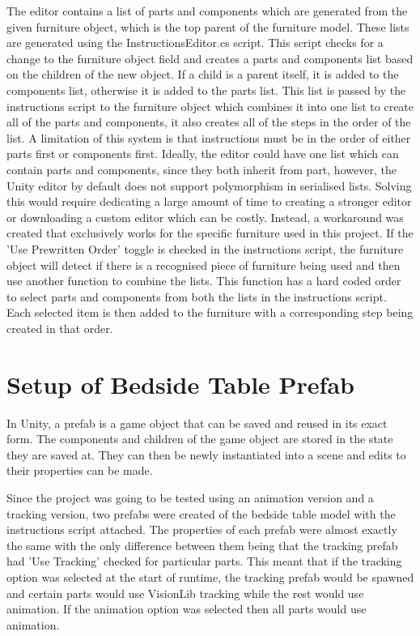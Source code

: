 \documentclass{l4proj}
\begin{document}
The editor contains a list of parts and components which are generated from the given furniture object, which is the top parent of the furniture model. These lists are generated using the InstructionsEditor.cs script. This script checks for a change to the furniture object field and creates a parts and components list based on the children of the new object. If a child is a parent itself, it is added to the components list, otherwise it is added to the parts list. This list is passed by the instructions script to the furniture object which combines it into one list to create all of the parts and components, it also creates all of the steps in the order of the list. A limitation of this system is that instructions must be in the order of either parts first or components first. Ideally, the editor could have one list which can contain parts and components, since they both inherit from part, however, the Unity editor by default does not support polymorphism in serialised lists. Solving this would require dedicating a large amount of time to creating a stronger editor or downloading a custom editor which can be costly. Instead, a workaround was created that exclusively works for the specific furniture used in this project. If the 'Use Prewritten Order' toggle is checked in the instructions script, the furniture object will detect if there is a recognised piece of furniture being used and then use another function to combine the lists. This function has a hard coded order to select parts and components from both the lists in the instructions script. Each selected item is then added to the furniture with a corresponding step being created in that order.

\section{Setup of Bedside Table Prefab}

In Unity, a prefab is a game object that can be saved and reused in its exact form. The components and children of the game object are stored in the state they are saved at. They can then be newly instantiated into a scene and edits to their properties can be made.

Since the project was going to be tested using an animation version and a tracking version, two prefabs were created of the bedside table model with the instructions script attached. The properties of each prefab were almost exactly the same with the only difference between them being that the tracking prefab had 'Use Tracking' checked for particular parts. This meant that if the tracking option was selected at the start of runtime, the tracking prefab would be spawned and certain parts would use VisionLib tracking while the rest would use animation. If the animation option was selected then all parts would use animation.
\end{document}
